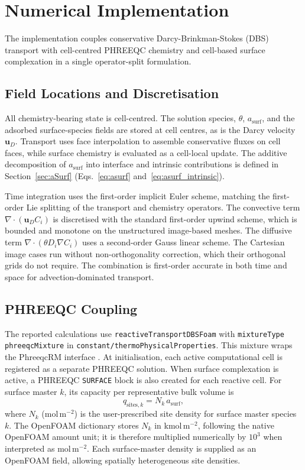 \section{Numerical Implementation}

The implementation couples conservative Darcy-Brinkman-Stokes (DBS) transport
with cell-centred PHREEQC chemistry and cell-based surface complexation in a
single operator-split formulation.

\subsection{Field Locations and Discretisation}

All chemistry-bearing state is cell-centred. The solution species, $\theta$,
$a_{\mathrm{surf}}$, and the adsorbed surface-species fields are stored at cell
centres, as is the Darcy velocity $\bm{u}_D$. Transport uses face interpolation
to assemble conservative fluxes on cell faces, while surface chemistry is
evaluated as a cell-local update. The additive decomposition of
$a_{\mathrm{surf}}$ into interface and intrinsic contributions is defined in
Section~\ref{sec:aSurf}
(Eqs.~\eqref{eq:asurf} and~\eqref{eq:asurf_intrinsic}).

Time integration uses the first-order implicit Euler scheme, matching the
first-order Lie splitting of the transport and chemistry operators. The
convective term $\nabla\cdot(\bm{u}_D C_i)$ is discretised with the standard
first-order upwind scheme, which is bounded and monotone on the unstructured
image-based meshes. The diffusive term $\nabla\cdot(\theta D_i \nabla C_i)$
uses a second-order Gauss linear scheme. The Cartesian image cases run without
non-orthogonality correction, which their orthogonal grids do not require. The
combination is first-order accurate in both time and space for
advection-dominated transport.

\subsection{PHREEQC Coupling}

The reported calculations use \texttt{reactiveTransportDBSFoam} with
\texttt{mixtureType phreeqcMixture} in
\texttt{constant/thermoPhysicalProperties}. This mixture wraps the PhreeqcRM
interface \citep{parkhurst2015phreeqcrm}. At
initialisation, each active computational cell is registered as a separate
PHREEQC solution. When surface complexation is active, a PHREEQC \texttt{SURFACE}
block is also created for each reactive cell. For surface master $k$, its
capacity per representative bulk volume is
\begin{equation}
q_{\mathrm{sites},k} = N_k \, a_{\mathrm{surf}},
\label{eq:nsites}
\end{equation}
where $N_k$ (mol\,m$^{-2}$) is the user-prescribed site density for surface
master species $k$.
The OpenFOAM dictionary stores $N_k$ in kmol\,m$^{-2}$, following the native
OpenFOAM amount unit; it is therefore multiplied numerically by $10^3$ when
interpreted as mol\,m$^{-2}$. Each surface-master density is supplied as an
OpenFOAM field, allowing spatially heterogeneous site densities.

